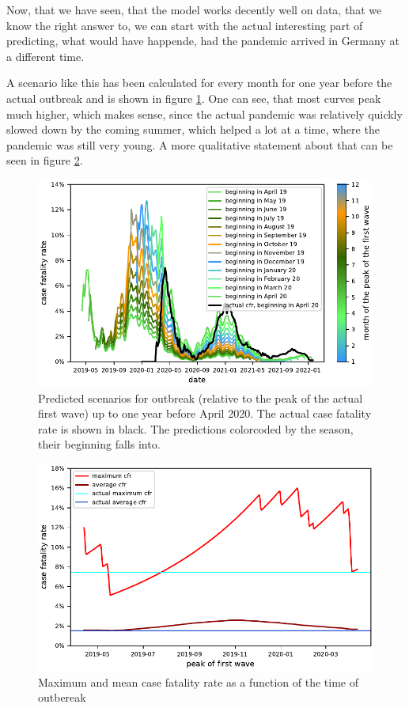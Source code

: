 \documentclass{article}
\begin{document}
Now, that we have seen, that the model works decently well on data, that we know the right answer to, we can start with the actual interesting part of predicting, what would have happende, had the pandemic arrived in Germany at a different time. 

A scenario like this has been calculated for every month for one year before the actual outbreak and is shown in figure \ref{fig:cfr_timeseries}. One can see, that most curves peak much higher, which makes sense, since the actual pandemic was relatively quickly slowed down by the coming summer, which helped a lot at a time, where the pandemic was still very young. A more qualitative statement about that can be seen in figure \ref{fig:max_mean_cfr}. 

\begin{figure}[hbt!]
  \begin{center}
    \includegraphics{../fig/CfrTimeseries.pdf}
    \caption{Predicted scenarios for outbreak (relative to the peak of the actual first wave) up to one year before April 2020. The actual case fatality rate is shown in black. The predictions colorcoded by the season, their beginning falls into.}
    \label{fig:cfr_timeseries}
  \end{center}
\end{figure}

\begin{figure}[hbt!]
  \begin{center}
    \includegraphics{../fig/MaxMeanCfr.pdf}
    \caption{Maximum and mean case fatality rate as a function of the time of outbereak}
    \label{fig:max_mean_cfr}
  \end{center}
\end{figure}
\end{document}
